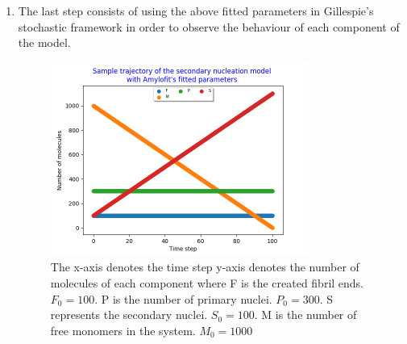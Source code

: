 \documentclass[11pt,a4paper]{article}
\begin{document}
\begin{enumerate}
  \item The last step consists of using the above fitted parameters in Gillespie's stochastic framework in order to observe the behaviour of each component of the model.
    \begin{figure}[H]
    \centering
    \includegraphics[width=0.8\textwidth]{Images/sim1.png}
    \caption{The x-axis denotes the time step y-axis denotes the number of molecules of each component where
      F is the created fibril ends. $F_{0} = 100$.
      P is the number of primary nuclei. $P_{0} = 300$.
      S represents the secondary nuclei. $S_{0} = 100$.
      M is the number of free monomers in the system. $M_{0} = 1000$
     }
    \label{fig: sample trajectory}
    \end{figure}
\end{enumerate}
\end{document}
